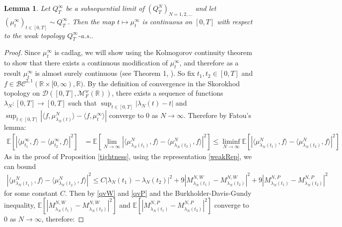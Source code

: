 \documentclass{article}
\newtheorem{lemma}[theorem]{Lemma}
\newcommand{\B}[1]{\mathbb{#1}}
\newcommand{\C}[1]{\mathcal{#1}}
\begin{document}
\vspace{1em}

\begin{lemma} \label{asContinuity} Let $Q^\infty_T$ be a subsequential limit of $(Q^N_T)_{N=1,2,\ldots}$ and let $(\mu^\infty_t)_{t\in [0,T]}\sim Q^\infty_T$. Then the map $t\mapsto \mu_t^\infty$ is continuous on $[0,T]$ with respect to the weak topology $Q_T^\infty$-a.s..
\end{lemma}

\begin{proof}
    Since $\mu_t^\infty$ is cadlag, we will show using the Kolmogorov continuity theorem to show that there exists a continuous modification of $\mu_t^\infty$, and therefore as a result $\mu_t^\infty$ is almost surely continuous (see Theorem 1, \cite{schilling}). So fix $t_1,t_2\in [0,T]$ and $f\in \C{BC}^{2,1}(\B{R}\times [0,\infty),\B{R})$. By the definition of convergence in the Skorokhod topology on $\C{D}([0,T],\C{M}^w_F(\B{R}))$, there exists a sequence of functions $\lambda_N:[0,T]\to[0,T]$ such that $\sup_{t\in [0,T]}|\lambda_N(t)-t|$ and $\sup_{t\in [0,T]}|\langle f,\mu_{\lambda_N(t)}^N\rangle-\langle f, \mu_t^\infty\rangle|$ converge to $0$ as $N\to\infty$. Therefore by Fatou's lemma:
    \begin{align*}
        \B{E}[|\langle \mu_{t_1}^\infty,f\rangle -\langle \mu_{t_2}^\infty,f\rangle|^2]&=\B{E}[\lim_{N\to\infty}|\langle \mu_{\lambda_N(t_1)}^N,f\rangle -\langle \mu_{\lambda_N(t_2)}^N,f\rangle|^2]\leq \liminf_{N\to\infty}\B{E}[|\langle \mu_{\lambda_N(t_1)}^N,f\rangle -\langle \mu_{\lambda_N(t_2)}^N,f\rangle|^2]
    \end{align*}
    As in the proof of Proposition \ref{tightness}, using the representation \eqref{weakRep}, we can bound
    \begin{align*}
        |\langle \mu_{\lambda_N(t_1)}^N,f\rangle -\langle \mu_{\lambda_N(t_2)}^N,f\rangle|^2 \leq C|\lambda_N(t_1)-\lambda_N(t_2)|^2+9|M_{\lambda_N(t_1)}^{N,W}-M_{\lambda_N(t_2)}^{N,W}|^2+9|M_{\lambda_N(t_1)}^{N,P}-M_{\lambda_N(t_2)}^{N,P}|^2
    \end{align*}
    for some constant $C$. Then by \eqref{qvW} and \eqref{qvP} and the Burkholder-Davis-Gundy inequality, $\B{E}[|M_{\lambda_N(t_1)}^{N,W}-M_{\lambda_N(t_2)}^{N,W}|^2]$ and $\B{E}[|M_{\lambda_N(t_1)}^{N,P}-M_{\lambda_N(t_2)}^{N,P}|^2]$ converge to $0$ as $N\to\infty$, therefore:

\end{proof}
\end{document}
